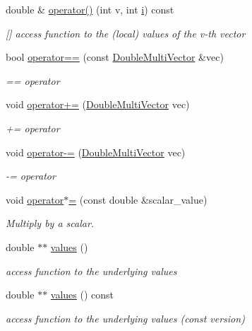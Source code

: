 \begin{DoxyCompactItemize}
double \& \hyperlink{classoomph_1_1DoubleMultiVector_a6c3d82fb4be996cc1da79c1477a4a8c8}{operator()} (int v, int \hyperlink{cfortran_8h_adb50e893b86b3e55e751a42eab3cba82}{i}) const
\begin{DoxyCompactList}\small\item\em \mbox{[}\mbox{]} access function to the (local) values of the v-\/th vector \end{DoxyCompactList}\item 
bool \hyperlink{classoomph_1_1DoubleMultiVector_ab06d289ff582170e19500861e8bd7e90}{operator==} (const \hyperlink{classoomph_1_1DoubleMultiVector}{Double\+Multi\+Vector} \&vec)
\begin{DoxyCompactList}\small\item\em == operator \end{DoxyCompactList}\item 
void \hyperlink{classoomph_1_1DoubleMultiVector_ac5dad0557a1a0a62a4155aa6809de948}{operator+=} (\hyperlink{classoomph_1_1DoubleMultiVector}{Double\+Multi\+Vector} vec)
\begin{DoxyCompactList}\small\item\em += operator \end{DoxyCompactList}\item 
void \hyperlink{classoomph_1_1DoubleMultiVector_ab9d6d470f442410ee4df68e008d5ec7f}{operator-\/=} (\hyperlink{classoomph_1_1DoubleMultiVector}{Double\+Multi\+Vector} vec)
\begin{DoxyCompactList}\small\item\em -\/= operator \end{DoxyCompactList}\item 
void \hyperlink{classoomph_1_1DoubleMultiVector_a4edb706ef2c1e5861a7f7310b5059f03}{operator$\ast$=} (const double \&scalar\+\_\+value)
\begin{DoxyCompactList}\small\item\em Multiply by a scalar. \end{DoxyCompactList}\item 
double $\ast$$\ast$ \hyperlink{classoomph_1_1DoubleMultiVector_ab6e0f86c71dffe3678598d6c714d113c}{values} ()
\begin{DoxyCompactList}\small\item\em access function to the underlying values \end{DoxyCompactList}\item 
double $\ast$$\ast$ \hyperlink{classoomph_1_1DoubleMultiVector_a36a7c886943d35cb36a498f57dbd1964}{values} () const
\begin{DoxyCompactList}\small\item\em access function to the underlying values (const version) \end{DoxyCompactList}\item 

\end{DoxyCompactItemize}

